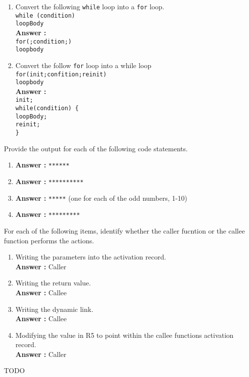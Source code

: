 \documentclass[a4paper,11pt]{article}
\newcommand{\answer}{\textbf{Answer : }}
\newcommand{\cd}{\texttt}
\newcommand{\benu}{\begin{enumerate}}
\newcommand{\enu}{\end{enumerate}}
\begin{document}
 \item 
 \benu
 \item Convert the following \cd{while} loop into a \cd{for} loop. \\
 \cd{while (condition)} \\
 \quad \cd{loopBody} \\
 \answer \\
 \cd {for(;condition;)} \\
 \quad \cd{loopbody} \\
 \item Convert the follow \cd{for} loop into a while loop \\
 \cd{for(init;confition;reinit)} \\
 \cd{loopbody} \\
 \answer \\
\cd{init;} \\
\cd{while(condition) \{} \\
\qquad \cd{loopBody;} \\
\cd{reinit;} \\
\cd{\}} \\
\enu

\item Provide the output for each of the following code statements. \\
\benu
\item \answer \cd{******}
\item \answer \cd{**********}
\item \answer \cd{*****} (one for each of the odd numbers, 1-10)
\item \answer \cd{*********}
\enu

\item For each of the following items, identify whether the caller fucntion or the callee function performs the actions.
\benu
\item Writing the parameters into the activation record. \\
\answer Caller
\item Writing the return value. \\
\answer Callee
\item Writing the dynamic link. \\
\answer Callee
\item Modifying the value in R5 to point within the callee functions activation record. \\
\answer Caller
\enu

\item TODO
\end{document}
